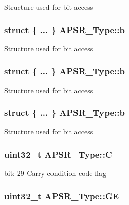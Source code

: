 Structure used for bit access \hypertarget{union_a_p_s_r___type_a58bbe4a401dd92b53a0e9e2ab20486a9}{
\subsubsection[{b}]{\setlength{\rightskip}{0pt plus 5cm}struct \{ ... \}   A\-P\-S\-R\-\_\-\-Type\-::b}}\label{union_a_p_s_r___type_a58bbe4a401dd92b53a0e9e2ab20486a9}
Structure used for bit access \hypertarget{union_a_p_s_r___type_ad6830b9357a92992d38548e1cfd4d7f3}{
\subsubsection[{b}]{\setlength{\rightskip}{0pt plus 5cm}struct \{ ... \}   A\-P\-S\-R\-\_\-\-Type\-::b}}\label{union_a_p_s_r___type_ad6830b9357a92992d38548e1cfd4d7f3}
Structure used for bit access \hypertarget{union_a_p_s_r___type_ad37fe4d11a12cc5b26a7e8612dc4d3ec}{
\subsubsection[{b}]{\setlength{\rightskip}{0pt plus 5cm}struct \{ ... \}   A\-P\-S\-R\-\_\-\-Type\-::b}}\label{union_a_p_s_r___type_ad37fe4d11a12cc5b26a7e8612dc4d3ec}
Structure used for bit access \hypertarget{union_a_p_s_r___type_a86e2c5b891ecef1ab55b1edac0da79a6}{
\subsubsection[{C}]{\setlength{\rightskip}{0pt plus 5cm}uint32\-\_\-t A\-P\-S\-R\-\_\-\-Type\-::\-C}}\label{union_a_p_s_r___type_a86e2c5b891ecef1ab55b1edac0da79a6}
bit\-: 29 Carry condition code flag \hypertarget{union_a_p_s_r___type_adcb98a5b9c93b0cb69cdb7af5638f32e}{
\subsubsection[{G\-E}]{\setlength{\rightskip}{0pt plus 5cm}uint32\-\_\-t A\-P\-S\-R\-\_\-\-Type\-::\-G\-E}}\label{union_a_p_s_r___type_adcb98a5b9c93b0cb69cdb7af5638f32e}
